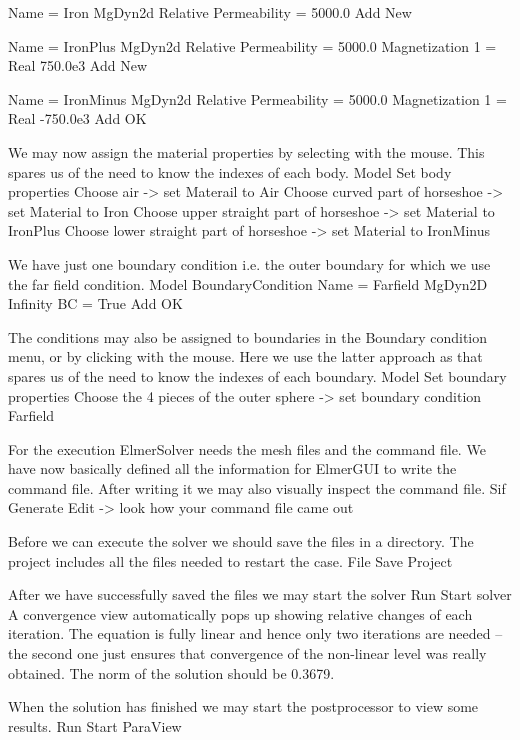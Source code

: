     Name = Iron
    MgDyn2d
      Relative Permeability = 5000.0
    Add
    New

    Name = IronPlus
    MgDyn2d
      Relative Permeability = 5000.0
      Magnetization 1 = Real 750.0e3
    Add
    New

    Name = IronMinus
    MgDyn2d
      Relative Permeability = 5000.0
      Magnetization 1 = Real -750.0e3
    Add
    OK
\ttend

We may now assign the material properties by selecting with the mouse.
This spares us of the 
need to know the indexes of each body.
\ttbegin
Model
  Set body properties
    Choose air -> set Materail to Air
    Choose curved part of horseshoe -> set Material to Iron
    Choose upper straight part of horseshoe -> set Material to IronPlus
    Choose lower straight part of horseshoe -> set Material to IronMinus
\ttend

We have just one boundary condition i.e. the outer boundary for which we use the far field condition.
\ttbegin
Model
  BoundaryCondition
    Name = Farfield
    MgDyn2D
      Infinity BC = True
    Add
    OK
\ttend   

The conditions may also be assigned to boundaries in the Boundary condition menu, or 
by clicking with the mouse. Here we use the latter approach as that spares us of the 
need to know the indexes of each boundary.
\ttbegin
Model
  Set boundary properties
    Choose the 4 pieces of the outer sphere -> set boundary condition Farfield
\ttend

For the execution 
ElmerSolver needs the mesh files and the command file. We have now basically defined
all the information for ElmerGUI to write the command file. After writing it we may also visually 
inspect the command file.
\ttbegin
Sif 
  Generate
  Edit -> look how your command file came out  
\ttend

Before we can execute the solver we should save the files in a directory. The project includes
all the files needed to restart the case.
\ttbegin
File 
  Save Project
\ttend

After we have successfully saved the files we may start the solver
\ttbegin
Run
  Start solver
\ttend
A convergence view automatically pops up showing relative changes of each iteration.
The equation is fully linear and hence only two iterations are needed -- the second 
one just ensures that convergence of the non-linear level was really obtained. 
The norm of the solution should be 0.3679.

When the solution has finished we may start the postprocessor to view some results.
\ttbegin
Run
  Start ParaView
\ttend


